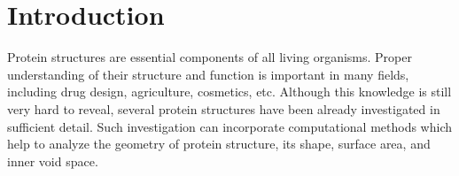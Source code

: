 \documentclass{llncs}
\begin{document}
\begin{abstract}
\end{abstract}

\section{Introduction}

Protein structures are essential components of all living organisms.
Proper understanding of their structure and function is important in many fields, including drug design, agriculture, cosmetics, etc.
Although this knowledge is still very hard to reveal, several protein structures have been already investigated in sufficient detail. %
Such investigation can incorporate computational methods which help to analyze the geometry of protein structure,  its shape, surface area, and inner void space. 
\end{document}
